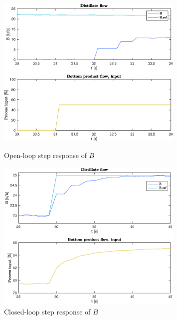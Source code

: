 \documentclass[12pt]{article}
\begin{document}
\begin{figure}
\centering
\includegraphics[width=0.8\textwidth]{../Systemanalyse/Log_Data_to_Matlab/Figurer/Stegeksperimenter/FC1019.eps}
\caption{Open-loop step response of $B$}
\label{fig:ol_step_FC1019}

\includegraphics[width=0.8\textwidth]{../Systemanalyse/Log_Data_to_Matlab/Figurer/Stegeksperimenter/FC1019_step.eps}
\caption{Closed-loop step response of $B$}
\label{fig:cl_step_FC1019}
\end{figure}
\end{document}
